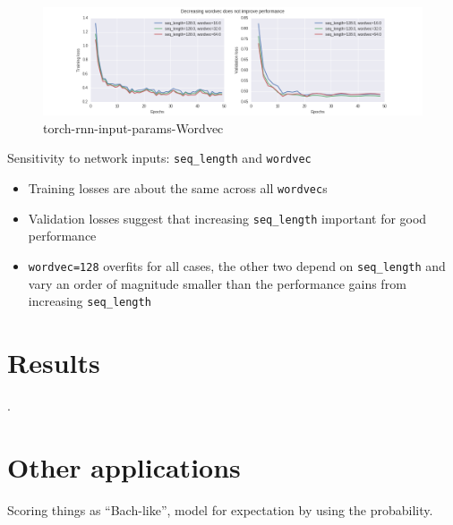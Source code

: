 \begin{figure}[htpb]
  \centering
  \includegraphics[width=1.0\linewidth]{torch-rnn-input-params-wordvec.png}
  \caption{torch-rnn-input-params-Wordvec}
  \label{fig:torch-rnn-input-params-wordvec}
\end{figure}

Sensitivity to network inputs: \texttt{seq\_length} and \texttt{wordvec}
\begin{itemize}
    \item Training losses are about the same across all \texttt{wordvec}s
    \item Validation losses suggest that increasing \texttt{seq\_length} important for
        good performance 
    \item \texttt{wordvec=128} overfits for all cases, the other two depend on
        \texttt{seq\_length} and vary an order of magnitude smaller than the
        performance gains from increasing \texttt{seq\_length}
\end{itemize}

\section{Results}

.


\section{Other applications}

Scoring things as ``Bach-like'', model for expectation by using the probability.
